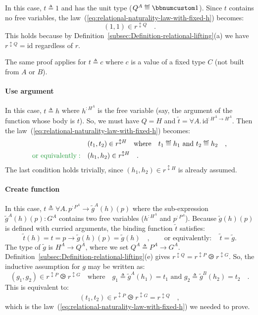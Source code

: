 In this case, $t\triangleq1$ and has the unit type ($Q^{A}\triangleq\bbnum 1$).
Since $t$ contains no free variables, the law~(\ref{eq:relational-naturality-law-with-fixed-h})
becomes:
\[
(1,1)\in r^{\updownarrow Q}\quad.
\]
This holds because by Definition~\ref{subsec:Definition-relational-lifting}(a)
we have $r^{\updownarrow Q}=\text{id}$ regardless of $r$.

The same proof applies for $t\triangleq c$ where $c$ is a value
of a fixed type $C$ (not built from $A$ or $B$).

\paragraph{Use argument}

In this case, $t\triangleq h$ where $h^{:H^{A}}$ is the free variable
(say, the argument of the function whose body is $t$). So, we must
have $Q=H$ and $\tilde{t}=\forall A.\,\text{id}^{:H^{A}\rightarrow H^{A}}$.
Then the law~(\ref{eq:relational-naturality-law-with-fixed-h}) becomes:
\begin{align*}
 & (t_{1},t_{2})\in r^{\updownarrow H}\quad\text{where}\quad t_{1}\triangleq h_{1}\text{ and }t_{2}\triangleq h_{2}\quad,\\
{\color{greenunder}\text{or equivalently}:}\quad & (h_{1},h_{2})\in r^{\updownarrow H}\quad.
\end{align*}
The last condition holds trivially, since $(h_{1},h_{2})\in r^{\updownarrow H}$
is already assumed.

\paragraph{Create function}

In this case, $t\triangleq\forall A.\,p^{:P^{A}}\rightarrow\tilde{g}^{A}(h)(p)$
where the sub-expression $\tilde{g}^{A}(h)(p):G^{A}$ contains two
free variables ($h^{:H^{A}}$ and $p^{:P^{A}}$). Because $\tilde{g}(h)(p)$
is defined with curried arguments, the binding function $\tilde{t}$
satisfies:
\[
\tilde{t}(h)=t=p\rightarrow\tilde{g}(h)(p)=\tilde{g}(h)\quad,\quad\quad\text{or equivalently}:\quad\tilde{t}=\tilde{g}.
\]
The type of $\tilde{g}$ is $H^{A}\rightarrow Q^{A}$, where we set
$Q^{A}\triangleq P^{A}\rightarrow G^{A}$. Definition~\ref{subsec:Definition-relational-lifting}(e)
gives $r^{\updownarrow Q}=r^{\updownarrow P}\ogreaterthan r^{\updownarrow G}$.
So, the inductive assumption for $g$ may be written as:
\[
(g_{1},g_{2})\in r^{\updownarrow P}\ogreaterthan r^{\updownarrow G}\quad\text{where}\quad g_{1}\triangleq\tilde{g}^{A}(h_{1})=t_{1}\text{ and }g_{2}\triangleq\tilde{g}^{B}(h_{2})=t_{2}\quad.
\]
This is equivalent to:
\[
(t_{1},t_{2})\in r^{\updownarrow P}\ogreaterthan r^{\updownarrow G}=r^{\updownarrow Q}\quad,
\]
which is the law~(\ref{eq:relational-naturality-law-with-fixed-h})
we needed to prove.

